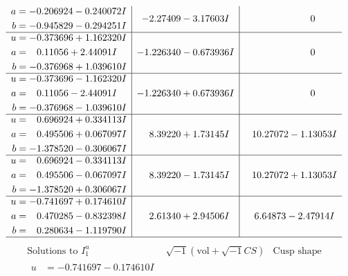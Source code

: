\documentclass[1p]{elsarticle_modified}
\theoremstyle{definition}
\newcommand{\I}{\sqrt{-1}}
\begin{document}
$$\begin{array}{c|c|c}
\begin{aligned}
a &= -0.206924 - 0.240072 I \\
b &= -0.945829 - 0.294251 I\end{aligned}
 & -2.27409 - 3.17603 I & \phantom{-0.000000 } 0 \\ \hline\begin{aligned}
u &= -0.373696 + 1.162320 I \\
a &= \phantom{-}0.11056 + 2.44091 I \\
b &= -0.376968 + 1.039610 I\end{aligned}
 & -1.226340 - 0.673936 I & \phantom{-0.000000 } 0 \\ \hline\begin{aligned}
u &= -0.373696 - 1.162320 I \\
a &= \phantom{-}0.11056 - 2.44091 I \\
b &= -0.376968 - 1.039610 I\end{aligned}
 & -1.226340 + 0.673936 I & \phantom{-0.000000 } 0 \\ \hline\begin{aligned}
u &= \phantom{-}0.696924 + 0.334113 I \\
a &= \phantom{-}0.495506 + 0.067097 I \\
b &= -1.378520 - 0.306067 I\end{aligned}
 & \phantom{-}8.39220 + 1.73145 I & \phantom{-}10.27072 - 1.13053 I \\ \hline\begin{aligned}
u &= \phantom{-}0.696924 - 0.334113 I \\
a &= \phantom{-}0.495506 - 0.067097 I \\
b &= -1.378520 + 0.306067 I\end{aligned}
 & \phantom{-}8.39220 - 1.73145 I & \phantom{-}10.27072 + 1.13053 I \\ \hline\begin{aligned}
u &= -0.741697 + 0.174610 I \\
a &= \phantom{-}0.470285 - 0.832398 I \\
b &= \phantom{-}0.280634 - 1.119790 I\end{aligned}
 & \phantom{-}2.61340 + 2.94506 I & \phantom{-}6.64873 - 2.47914 I\\
 \hline 
 \end{array}$$\newpage$$\begin{array}{c|c|c}  
\text{Solutions to }I^u_{1}& \I (\text{vol} + \sqrt{-1}CS) & \text{Cusp shape}\\
 \hline 
\begin{aligned}
u &= -0.741697 - 0.174610 I \\

\end{aligned}
\end{array}$$
\end{document}
